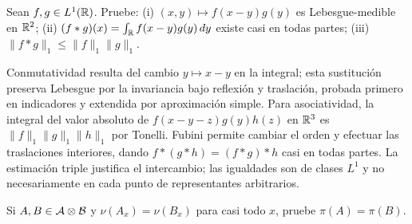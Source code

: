\begin{ejercicio}\label{ej:v2-l11-6}
Sean $f,g\in L^1(\mathbb R)$. Pruebe: (i) $(x,y)\mapsto f(x-y)g(y)$ es Lebesgue-medible en $\mathbb R^2$; (ii) $(f*g)(x)=\int_\mathbb R f(x-y)g(y)\,dy$ existe casi en todas partes; (iii) $\|f*g\|_1\le\|f\|_1\|g\|_1$.
\end{ejercicio}

\begin{observacion}
Conmutatividad resulta del cambio $y\mapsto x-y$ en la integral; esta sustitución preserva Lebesgue por la invariancia bajo reflexión y traslación, probada primero en indicadores y extendida por aproximación simple. Para asociatividad, la integral del valor absoluto de $f(x-y-z)g(y)h(z)$ en $\mathbb R^3$ es $\|f\|_1\|g\|_1\|h\|_1$ por Tonelli. Fubini permite cambiar el orden y efectuar las traslaciones interiores, dando $f*(g*h)=(f*g)*h$ casi en todas partes. La estimación triple justifica el intercambio; las igualdades son de clases $L^1$ y no necesariamente en cada punto de representantes arbitrarios.
\end{observacion}
\begin{ejercicio}\label{ej:v2-l11-7}
Si $A,B\in\mathcal A\otimes\mathcal B$ y $\nu(A_x)=\nu(B_x)$ para casi todo $x$, pruebe $\pi(A)=\pi(B)$.
\end{ejercicio}

